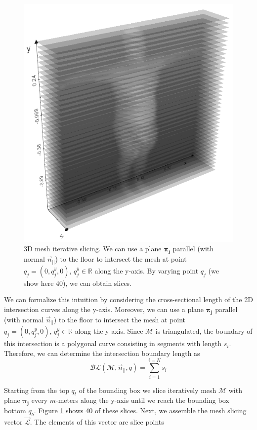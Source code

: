 \documentclass[runningheads, orivec]{llncs}
\begin{document}
\begin{figure}[H]
	\begin{center}
		\includegraphics[width=0.5\linewidth]{subject_2_with_cutting_planes_xrays.png}
	\end{center}
	\caption{3D mesh iterative slicing. We 
		can use a plane $\boldsymbol{\pi_j}$ parallel (with normal 
		$\vec{n}_{||}$) to the 
		floor to intersect the mesh at point $q_j = (0, q^y_j, 0), \,  q^y_j 
		\in 
		\mathbb{R}$ along the y-axis. By varying point $q_j$ (we show here 40), 
		we can obtain 
		slices.}
	\label{fig:subjects_planes_xrays}
\end{figure}

We 
can formalize this intuition by considering the cross-sectional length of the 
2D intersection curves along the y-axis. Moreover, we 
can 
use a plane $\boldsymbol{\pi_j}$ parallel (with normal $\vec{n}_{||}$) to the 
floor to intersect the mesh at point $q_j = (0, q^y_j, 0), \,  q^y_j \in 
\mathbb{R}$ along the y-axis. Since $\mathcal{M}$ is triangulated, the boundary 
of this 
intersection is a polygonal curve consisting in segments with length $s_i$. 
Therefore, we 
can 
determine the intersection boundary length as
\begin{equation}\label{eq:boundary_length}
\mathcal{BL}(\mathcal{M}, \vec{n}_{||}, q) = \sum_{i = 
	1}^{i = N}s_i
\end{equation}

Starting 
from the 
top $q_t$ of the bounding box we slice iteratively mesh $\mathcal{M}$ with 
plane 
$\boldsymbol{\pi_j}$ every $m$-meters along the y-axis until we reach the 
bounding box bottom 
$q_b$. Figure \ref{fig:subjects_planes_xrays} shows 40 of these 
slices. Next, we assemble the mesh slicing vector $\vec{\mathcal{L}}$. The 
elements of 
this vector are slice points
\end{document}
